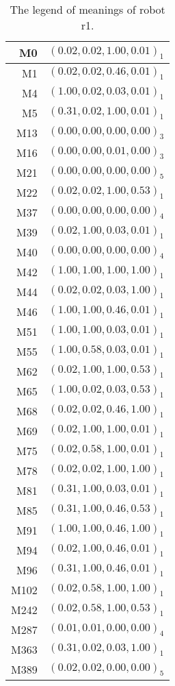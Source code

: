 \begin{table}[h]
\centering
{\footnotesize\begin{tabular}{||r|c||}
\hline\hline
M0 & $(0.02,0.02,1.00,0.01)_1$\\\hline
M1 & $(0.02,0.02,0.46,0.01)_1$\\\hline
M4 & $(1.00,0.02,0.03,0.01)_1$\\\hline
M5 & $(0.31,0.02,1.00,0.01)_1$\\\hline
M13 & $(0.00,0.00,0.00,0.00)_3$\\\hline
M16 & $(0.00,0.00,0.01,0.00)_3$\\\hline
M21 & $(0.00,0.00,0.00,0.00)_5$\\\hline
M22 & $(0.02,0.02,1.00,0.53)_1$\\\hline
M37 & $(0.00,0.00,0.00,0.00)_4$\\\hline
M39 & $(0.02,1.00,0.03,0.01)_1$\\\hline
M40 & $(0.00,0.00,0.00,0.00)_4$\\\hline
M42 & $(1.00,1.00,1.00,1.00)_1$\\\hline
M44 & $(0.02,0.02,0.03,1.00)_1$\\\hline
M46 & $(1.00,1.00,0.46,0.01)_1$\\\hline
M51 & $(1.00,1.00,0.03,0.01)_1$\\\hline
M55 & $(1.00,0.58,0.03,0.01)_1$\\\hline
M62 & $(0.02,1.00,1.00,0.53)_1$\\\hline
M65 & $(1.00,0.02,0.03,0.53)_1$\\\hline
M68 & $(0.02,0.02,0.46,1.00)_1$\\\hline
M69 & $(0.02,1.00,1.00,0.01)_1$\\\hline
M75 & $(0.02,0.58,1.00,0.01)_1$\\\hline
M78 & $(0.02,0.02,1.00,1.00)_1$\\\hline
M81 & $(0.31,1.00,0.03,0.01)_1$\\\hline
M85 & $(0.31,1.00,0.46,0.53)_1$\\\hline
M91 & $(1.00,1.00,0.46,1.00)_1$\\\hline
M94 & $(0.02,1.00,0.46,0.01)_1$\\\hline
M96 & $(0.31,1.00,0.46,0.01)_1$\\\hline
M102 & $(0.02,0.58,1.00,1.00)_1$\\\hline
M242 & $(0.02,0.58,1.00,0.53)_1$\\\hline
M287 & $(0.01,0.01,0.00,0.00)_4$\\\hline
M363 & $(0.31,0.02,0.03,1.00)_1$\\\hline
M389 & $(0.02,0.02,0.00,0.00)_5$\\\hline
\hline
\end{tabular}}
\caption{The legend of meanings of robot r1.}
\label{t:st:legend1a}
\end{table}


